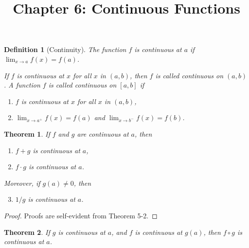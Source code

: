 \documentclass{article}
\newtheorem{definition}{Definition}
\newtheorem{theorem}{Theorem}
\begin{document}
\title{Chapter 6: Continuous Functions}
\maketitle

\begin{definition}[Continuity]
  The function $f$ is \emph{continuous at $a$} if $\lim_{x \rightarrow a}f(x)
  = f(a)$.

  If $f$ is continuous at $x$ for all $x$ in $(a, b)$, then $f$ is called
  \emph{continuous on $(a, b)$}. A function $f$ is called \emph{continuous on
  $[a, b]$} if \begin{enumerate}
    \item $f$ is continuous at $x$ for all $x$ in $(a, b)$,
    \item $\lim_{x \rightarrow a^+}f(x) = f(a)$ and $\lim_{x \rightarrow b^-}
      f(x) = f(b)$.
  \end{enumerate}
\end{definition}

\begin{theorem}
  If $f$ and $g$ are continuous at $a$, then \begin{enumerate}
    \item $f + g$ is continuous at $a$,
    \item $f \cdot g$ is continuous at $a$.
  \end{enumerate}
  Moreover, if $g(a) \neq 0$, then \begin{enumerate}
    \setcounter{enumi}{2}
    \item $1/g$ is continuous at $a$.
  \end{enumerate}
\end{theorem}

\begin{proof}
  Proofs are self-evident from Theorem 5-2.
\end{proof}

\begin{theorem}
  If $g$ is continuous at $a$, and $f$ is continuous at $g(a)$, then $f \circ
  g$ is continuous at $a$.
\end{theorem}
\end{document}
